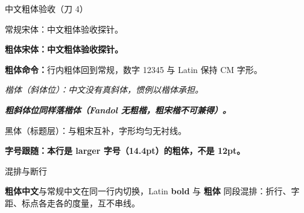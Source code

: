 \documentclass[12pt]{article}
\begin{document}
\zhf

\par\vskip 6pt{\zhhei 中文粗体验收（刀 4）\par}\vskip 12pt

常规宋体：中文粗体验收探针。

{\bfseries 粗体宋体：中文粗体验收探针。}

\textbf{粗体命令：}行内粗体回到常规，数字 12345 与 Latin 保持 CM 字形。

{\itshape 楷体（斜体位）：中文没有真斜体，惯例以楷体承担。}

{\bfseries\itshape 粗斜体位同样落楷体（Fandol 无粗楷，粗宋楷不可兼得）。}

{\zhhei 黑体（标题层）：与粗宋互补，字形均匀无衬线。}

{\large\bfseries 字号跟随：本行是 larger 字号（14.4pt）的粗体，不是 12pt。\par}

\par\vskip 6pt{\zhhei 混排与断行\par}\vskip 8pt

\textbf{粗体中文}与常规中文在同一行内切换，Latin \textbf{bold} 与
\textbf{粗体} 同段混排：折行、字距、标点各走各的度量，互不串线。
\end{document}
